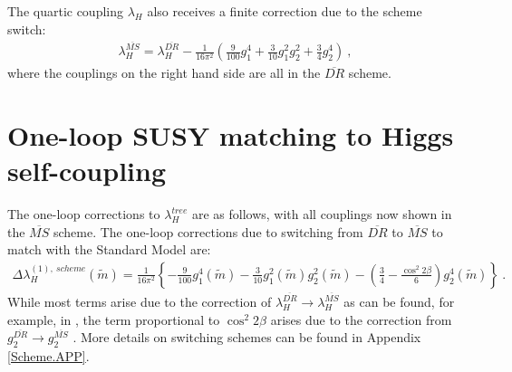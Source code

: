 \documentclass[12pt]{article}
\newcommand{\MS}{\overline{MS}}
\newcommand{\DR}{\overline{DR}}
\newcommand{\mS}{\tilde{m}}
\begin{document}
The quartic coupling $\lambda_H$ also receives a finite correction due to the scheme switch:
\begin{align}
\lambda_H^{\MS} = \lambda_H^{\DR} - \frac{1}{16\pi^2}\left( \frac{9}{100}g_1^4 + \frac{3}{10}g_1^2 g_2^2 + \frac{3}{4}g_2^4 \right) \ ,
\end{align}
where the couplings on the right hand side are all in the $\DR$ scheme.
\section{One-loop SUSY matching to Higgs self-coupling}


The one-loop corrections to $\lambda^{tree}_{H}$ are as follows, with all couplings now shown in the $\MS$ scheme.
The one-loop corrections due to switching from $\DR$ to $\MS$ to match with the Standard Model are:
\begin{align}
\Delta\lambda_H^{(1),~scheme}(\mS) =  \frac{1}{16 \pi^2} \left\{-\frac{9}{100} g_1^4(\mS) - \frac{3}{10} g_1^2(\mS) g_2^2(\mS) - \left(\frac{3}{4} - \frac{\cos^2 2 \beta}{6}\right) g_2^4(\mS)\right\} \ .
\label{SchemeSwitch.EQ}
\end{align}
While most terms arise due to the correction of $\lambda_H^{\DR} \to \lambda_H^{\MS}$ as can be found, for example, in \cite{Bagnaschi:2014rsa}, the term proportional to $\cos^2 2 \beta$ arises due to the correction from $g_2^{\DR} \to g_2^{\MS}$ \cite{Bagnaschi:2014rsa}. More details on switching schemes can be found in Appendix \ref{Scheme.APP}.
\end{document}
